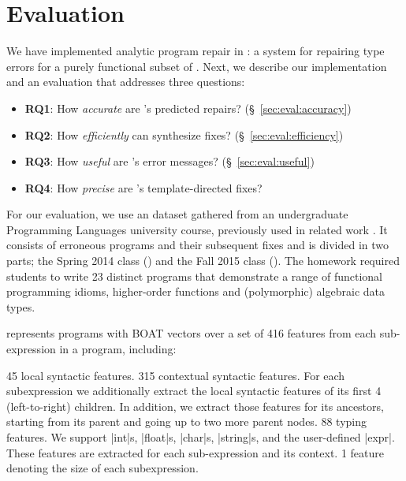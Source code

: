 \section{Evaluation}
\label{sec:eval}

\lstMakeShortInline[mathescape=true]{|}

We have implemented analytic program repair in \toolname: a system for
repairing type errors for a purely functional subset of \ocaml. Next,
we describe our implementation and an evaluation that addresses three
questions:

\begin{itemize}
    \item \textbf{RQ1}: How \emph{accurate} are \toolname's predicted repairs?
                        (\S~\ref{sec:eval:accuracy})
    \item \textbf{RQ2}: How \emph{efficiently} can \toolname synthesize fixes?
                        (\S~\ref{sec:eval:efficiency})
    \item \textbf{RQ3}: How \emph{useful} are \toolname's error messages?
                        (\S~\ref{sec:eval:useful})
    \item \textbf{RQ4}: How \emph{precise} are \toolname's template-directed fixes?

\end{itemize}


%
For our evaluation, we use an \ocaml dataset gathered from an undergraduate
Programming Languages university course, previously used in related work
\citep{yunounderstand,Seidel:2017}. It consists of erroneous programs and their
subsequent fixes and is divided in two parts; the Spring 2014 class (\SPRING)
and the Fall 2015 class (\FALL). The homework required students to write 23
distinct programs that demonstrate a range of functional programming idioms, \eg
higher-order functions and (polymorphic) algebraic data types.

%
\toolname represents programs with BOAT vectors over a set of 416 features from
each sub-expression in a program, including:

45 local syntactic features.
%
315 contextual syntactic features. For each subexpression we
additionally extract the local syntactic features of its first 4
(left-to-right) children. In addition, we extract those features for its
ancestors, starting from its parent and going up to two more parent nodes.
88 typing features. We support |int|s, |float|s, |char|s, |string|s, and
    the user-defined |expr|. These features are extracted for each
    sub-expression and its context.
%
1 feature denoting the size of each subexpression.

